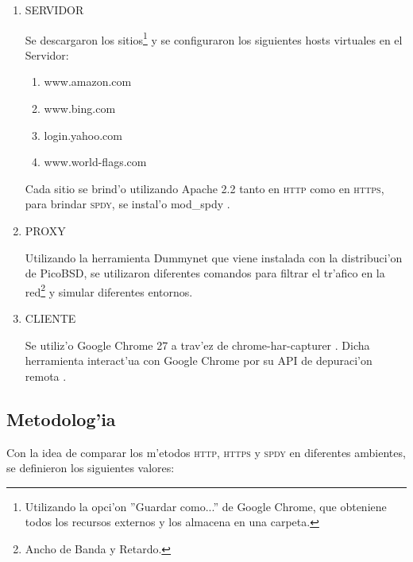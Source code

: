 \documentclass[a4paper,11pt,twocolumns]{article}
\begin{document}
\vspace*{1\baselineskip}

\begin{enumerate}
\item SERVIDOR

Se descargaron los sitios\footnote{Utilizando la opci'on ''Guardar como...'' de Google Chrome, que obteniene todos los recursos externos y los almacena en una carpeta.} y se configuraron los siguientes hosts virtuales en el Servidor:
\begin{enumerate}
\item www.amazon.com
\item www.bing.com
\item login.yahoo.com
\item www.world-flags.com \cite{flags}
\end{enumerate}
Cada sitio se brind'o utilizando Apache 2.2 \cite{apache} tanto en \textsc{http} como en \textsc{https}, para brindar \textsc{spdy}, se instal'o mod\_spdy \cite{modSPDY}.

\item PROXY

Utilizando la herramienta Dummynet \cite{dummynet} que viene instalada con la distribuci'on de PicoBSD, se utilizaron diferentes comandos \cite{ipfw} para filtrar el tr'afico en la red\footnote{Ancho de Banda y Retardo.} y simular diferentes entornos.

\item CLIENTE

Se utiliz'o Google Chrome 27 a trav'ez de chrome-har-capturer \cite{harCapt}. Dicha herramienta interact'ua con Google Chrome por su API de depuraci'on remota \cite{debuggingChrome}.

\end{enumerate} 

\subsection{Metodolog'ia}

Con la idea de comparar los m'etodos \textsc{http}, \textsc{https} y \textsc{spdy} en diferentes ambientes, se definieron los siguientes valores:
\end{document}
